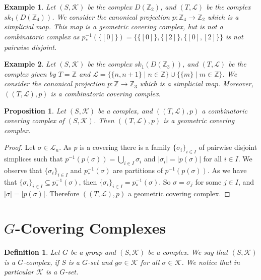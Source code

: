 \documentclass{amsart}
\newtheorem{proposition}{Proposition}[section]
\newtheorem{definition}{Definition}[section]
\newtheorem{example}{Example}[section]
\begin{document}
\begin{example}
Let $(S,\mathcal{K})$ be the complex $D(\mathbb{Z}_2)$, and $(T,\mathcal{L})$ be the complex  $sk_1(D(\mathbb{Z}_4))$. We consider the canonical projection $p\colon \mathbb{Z}_4\longrightarrow \mathbb{Z}_2$ which is a simplicial map.  This map is a  geometric covering complex, but is not a combinatoric complex as $p_*^{-1}(\{[0]\})=\{\{[0]\},\{[2]\},\{[0],[2]\}\}$ is not pairwise disjoint.
\end{example}

\begin{example}
Let $(S,\mathcal{K})$ be the complex $sk_1(D(\mathbb{Z}_3))$, and $(T,\mathcal{L})$ be the complex given by $T=\mathbb{Z}$ and $\mathcal{L}=\{\{n,n+1\}\mid n\in\mathbb{Z}\}\cup\{\{m\}\mid m\in\mathbb{Z}\}$. We consider the canonical projection $p\colon \mathbb{Z}\longrightarrow \mathbb{Z}_3$ which is a simplicial map. Moreover,  $((T,\mathcal{L}),p)$ is a combinatoric covering complex.
\end{example}

\begin{proposition}
Let $(S,\mathcal{K})$ be a complex, and $((T,\mathcal{L}),p)$ a combinatoric covering complex of $(S,\mathcal{K})$. Then $((T,\mathcal{L}),p)$ is a geometric covering complex.
\end{proposition}

\begin{proof}
Let $\sigma\in\mathcal{L}_n$.  As $p$ is a covering there is a family $\{\sigma_i\}_{i\in I}$ of pairwise disjoint simplices such that $p^{-1}(p(\sigma))=\bigcup_{i\in I}\sigma_i$ and $\vert \sigma_i\vert=\vert p(\sigma)\vert$ for all $i\in I$.  We observe that $ \{\sigma_i\}_{i\in I}$ and $p^{-1}_*(\sigma)$ are partitions of $p^{-1}(p(\sigma))$. As we have that $\{\sigma_i\}_{i\in I}\subseteq p^{-1}_*(\sigma)$, then $\{\sigma_i\}_{i\in I}= p^{-1}_*(\sigma)$. So $\sigma=\sigma_j$ for some $j\in I$, and $\vert\sigma\vert=\vert p(\sigma)\vert$. Therefore $((T,\mathcal{L}),p)$ a geometric covering complex.
\end{proof}

\section{$G$-Covering Complexes}

\begin{definition}
Let $G$ be a group and $(S,\mathcal{K})$ be a complex. We say that $(S,\mathcal{K})$ is a $G$-complex, if $S$ is a $G$-set and $g\sigma\in  \mathcal{K}$ for all $\sigma\in\mathcal{K}$. We notice that in particular $\mathcal{K}$ is a $G$-set.
\end{definition}
\end{document}
